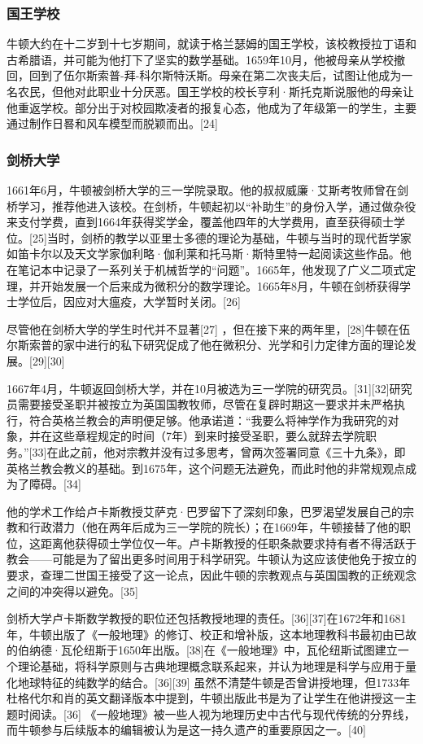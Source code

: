 \subsubsection{国王学校}  
牛顿大约在十二岁到十七岁期间，就读于格兰瑟姆的国王学校，该校教授拉丁语和古希腊语，并可能为他打下了坚实的数学基础。1659年10月，他被母亲从学校撤回，回到了伍尔斯索普-拜-科尔斯特沃斯。母亲在第二次丧夫后，试图让他成为一名农民，但他对此职业十分厌恶。国王学校的校长亨利·斯托克斯说服他的母亲让他重返学校。部分出于对校园欺凌者的报复心态，他成为了年级第一的学生，主要通过制作日晷和风车模型而脱颖而出。[24]
\subsubsection{剑桥大学}  
1661年6月，牛顿被剑桥大学的三一学院录取。他的叔叔威廉·艾斯考牧师曾在剑桥学习，推荐他进入该校。在剑桥，牛顿起初以“补助生”的身份入学，通过做杂役来支付学费，直到1664年获得奖学金，覆盖他四年的大学费用，直至获得硕士学位。[25]当时，剑桥的教学以亚里士多德的理论为基础，牛顿与当时的现代哲学家如笛卡尔以及天文学家伽利略·伽利莱和托马斯·斯特里特一起阅读这些作品。他在笔记本中记录了一系列关于机械哲学的“问题”。1665年，他发现了广义二项式定理，并开始发展一个后来成为微积分的数学理论。1665年8月，牛顿在剑桥获得学士学位后，因应对大瘟疫，大学暂时关闭。[26]

尽管他在剑桥大学的学生时代并不显著[27] ，但在接下来的两年里，[28]牛顿在伍尔斯索普的家中进行的私下研究促成了他在微积分、光学和引力定律方面的理论发展。[29][30]

1667年4月，牛顿返回剑桥大学，并在10月被选为三一学院的研究员。[31][32]研究员需要接受圣职并被按立为英国国教牧师，尽管在复辟时期这一要求并未严格执行，符合英格兰教会的声明便足够。他承诺道：“我要么将神学作为我研究的对象，并在这些章程规定的时间（7年）到来时接受圣职，要么就辞去学院职务。”[33]在此之前，他对宗教并没有过多思考，曾两次签署同意《三十九条》，即英格兰教会教义的基础。到1675年，这个问题无法避免，而此时他的非常规观点成为了障碍。[34]

他的学术工作给卢卡斯教授艾萨克·巴罗留下了深刻印象，巴罗渴望发展自己的宗教和行政潜力（他在两年后成为三一学院的院长）；在1669年，牛顿接替了他的职位，这距离他获得硕士学位仅一年。卢卡斯教授的任职条款要求持有者不得活跃于教会——可能是为了留出更多时间用于科学研究。牛顿认为这应该使他免于按立的要求，查理二世国王接受了这一论点，因此牛顿的宗教观点与英国国教的正统观念之间的冲突得以避免。[35]

剑桥大学卢卡斯数学教授的职位还包括教授地理的责任。[36][37]在1672年和1681年，牛顿出版了《一般地理》的修订、校正和增补版，这本地理教科书最初由已故的伯纳德·瓦伦纽斯于1650年出版。[38]在《一般地理》中，瓦伦纽斯试图建立一个理论基础，将科学原则与古典地理概念联系起来，并认为地理是科学与应用于量化地球特征的纯数学的结合。[36][39] 虽然不清楚牛顿是否曾讲授地理，但1733年杜格代尔和肖的英文翻译版本中提到，牛顿出版此书是为了让学生在他讲授这一主题时阅读。[36] 《一般地理》被一些人视为地理历史中古代与现代传统的分界线，而牛顿参与后续版本的编辑被认为是这一持久遗产的重要原因之一。[40]

